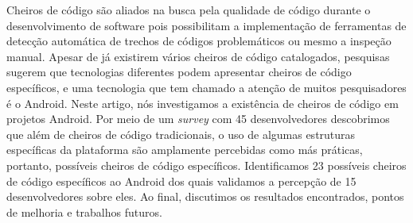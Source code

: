 Cheiros de código são aliados na busca pela qualidade de código durante o desenvolvimento de software pois possibilitam a implementação de ferramentas de detecção automática de trechos de códigos problemáticos ou mesmo a inspeção manual. Apesar de já existirem vários cheiros de código catalogados, pesquisas sugerem que tecnologias diferentes podem apresentar cheiros de código específicos, e uma tecnologia que tem chamado a atenção de muitos pesquisadores é o Android. Neste artigo, nós investigamos a existência de cheiros de código em projetos Android. Por meio de um \textit{survey} com 45 desenvolvedores descobrimos que além de cheiros de código tradicionais, o uso de algumas estruturas específicas da plataforma são amplamente percebidas como más práticas, portanto, possíveis cheiros de código específicos. Identificamos 23 possíveis cheiros de código específicos ao Android dos quais validamos a percepção de 15 desenvolvedores sobre eles. Ao final, discutimos os resultados encontrados, pontos de melhoria e trabalhos futuros.
